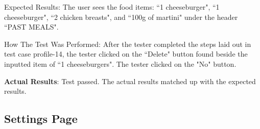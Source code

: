 \documentclass[12pt, titlepage]{article}
\begin{document}
\begin{enumerate}
		Expected Results: The user sees the food items: ``1 cheeseburger", ``1 cheeseburger", ``2 chicken breasts", and ``100g of martini" under the header ``PAST MEALS".
		
		How The Test Was Performed: After the tester completed the steps laid out in test case profile-14, the tester clicked on the ``Delete" button found beside the inputted item of ``1 cheeseburgers". The tester clicked on the "No" button.
		
		\textbf{Actual Results}: Test passed. The actual results matched up with the expected results.

	\end{enumerate}
	\subsection{Settings Page}
\end{document}
